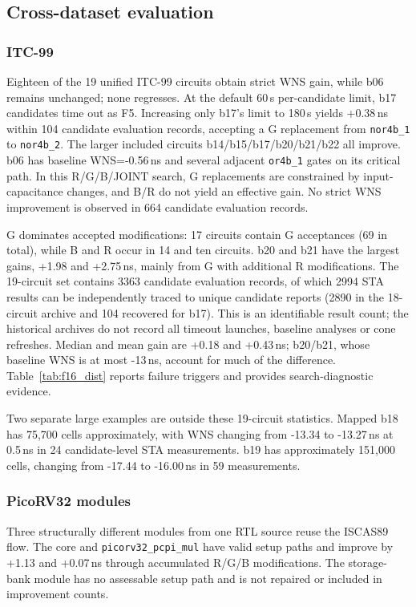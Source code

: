 \documentclass[preprint,12pt]{elsarticle}
\begin{document}
\subsection{Cross-dataset evaluation}\label{sec:ood}
\subsubsection{ITC-99}\label{sec:itc99}
Eighteen of the 19 unified ITC-99 circuits obtain strict WNS gain, while b06 remains unchanged; none regresses. At the default 60\,s per-candidate limit, b17 candidates time out as F5. Increasing only b17's limit to 180\,s yields +0.38\,ns within 104 candidate evaluation records, accepting a G replacement from \texttt{nor4b\_1} to \texttt{nor4b\_2}. The larger included circuits b14/b15/b17/b20/b21/b22 all improve. b06 has baseline WNS=-0.56\,ns and several adjacent \texttt{or4b\_1} gates on its critical path. In this R/G/B/JOINT search, G replacements are constrained by input-capacitance changes, and B/R do not yield an effective gain. No strict WNS improvement is observed in 664 candidate evaluation records.

G dominates accepted modifications: 17 circuits contain G acceptances (69 in total), while B and R occur in 14 and ten circuits. b20 and b21 have the largest gains, +1.98 and +2.75\,ns, mainly from G with additional R modifications. The 19-circuit set contains 3363 candidate evaluation records, of which 2994 STA results can be independently traced to unique candidate reports (2890 in the 18-circuit archive and 104 recovered for b17). This is an identifiable result count; the historical archives do not record all timeout launches, baseline analyses or cone refreshes. Median and mean gain are +0.18 and +0.43\,ns; b20/b21, whose baseline WNS is at most -13\,ns, account for much of the difference. Table~\ref{tab:f16_dist} reports failure triggers and provides search-diagnostic evidence.

Two separate large examples are outside these 19-circuit statistics. Mapped b18 has 75,700 cells approximately, with WNS changing from -13.34 to -13.27\,ns at 0.5\,ns in 24 candidate-level STA measurements. b19 has approximately 151,000 cells, changing from -17.44 to -16.00\,ns in 59 measurements.

\subsubsection{PicoRV32 modules}
Three structurally different modules from one RTL source reuse the ISCAS89 flow. The core and \texttt{picorv32\_pcpi\_mul} have valid setup paths and improve by +1.13 and +0.07\,ns through accumulated R/G/B modifications. The storage-bank module has no assessable setup path and is not repaired or included in improvement counts.
\end{document}
